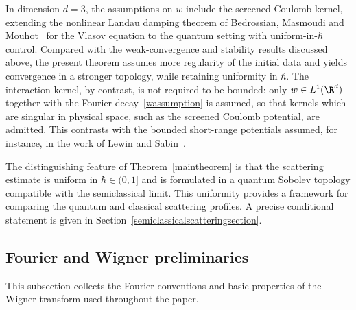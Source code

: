\begin{remark}
In dimension $d=3$, the assumptions on $w$ include the screened Coulomb kernel, extending the nonlinear Landau damping theorem of Bedrossian, Masmoudi and Mouhot~\cite{BedrossianMasmoudiMouhot2018} for the Vlasov equation to the quantum setting with uniform-in-$\hbar$ control. Compared with the weak-convergence and stability results discussed above, the present theorem assumes more regularity of the initial data and yields convergence in a stronger topology, while retaining uniformity in $\hbar$. The interaction kernel, by contrast, is not required to be bounded: only $w\in L^1(\R^d)$ together with the Fourier decay~\eqref{wassumption} is assumed, so that kernels which are singular in physical space, such as the screened Coulomb potential, are admitted. This contrasts with the bounded short-range potentials assumed, for instance, in the work of Lewin and Sabin~\cite{LewinSabinI2015}.
\end{remark}

\begin{remark}
The distinguishing feature of Theorem~\ref{maintheorem} is that the scattering estimate is uniform in $\hbar\in(0,1]$ and is formulated in a quantum Sobolev topology compatible with the semiclassical limit. This uniformity provides a framework for comparing the quantum and classical scattering profiles. A precise conditional statement is given in Section~\ref{semiclassicalscatteringsection}.
\end{remark}

\subsection{Fourier and Wigner preliminaries}\label{notationssection}

This subsection collects the Fourier conventions and basic properties of the Wigner transform used throughout the paper.

